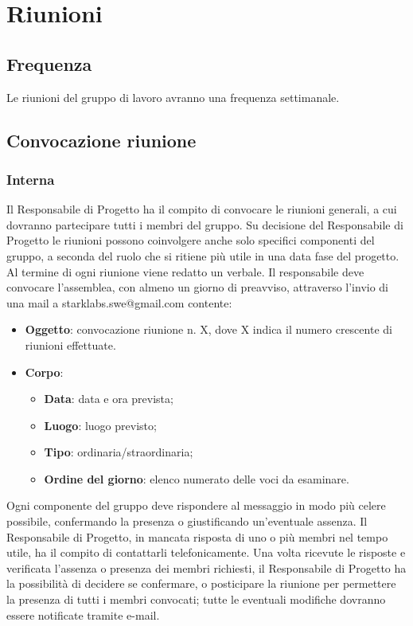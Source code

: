 \section{Riunioni}
\subsection{Frequenza}
Le riunioni del gruppo di lavoro avranno una frequenza settimanale.

\subsection{Convocazione riunione}

\subsubsection {Interna}
Il Responsabile di Progetto ha il compito di convocare le riunioni generali, a 
cui dovranno partecipare tutti i membri del gruppo.
Su decisione del Responsabile di Progetto le riunioni possono coinvolgere anche 
solo specifici componenti del gruppo, a seconda del ruolo che si ritiene più 
utile in una data fase del progetto. Al termine di ogni riunione viene redatto 
un verbale.
Il responsabile deve convocare l'assemblea, con almeno un giorno di preavviso, 
attraverso l'invio di una mail a starklabs.swe@gmail.com contente:
\begin{itemize}
\item \textbf{Oggetto}: convocazione riunione n. X, dove X indica il numero 
crescente di 
riunioni effettuate.
\item \textbf{Corpo}: 
\begin{itemize}
	\item \textbf{Data}: data e ora prevista;
	\item \textbf{Luogo}: luogo previsto;
	\item \textbf{Tipo}: ordinaria/straordinaria;
	\item \textbf{Ordine del giorno}: elenco numerato delle voci da esaminare.
\end{itemize}
\end{itemize}

Ogni componente del gruppo deve rispondere al messaggio in modo più celere 
possibile, confermando la presenza o giustificando un'eventuale assenza. Il 
Responsabile di Progetto, in mancata risposta di uno o più membri nel tempo 
utile, ha il compito di contattarli telefonicamente. Una volta ricevute le 
risposte e verificata l'assenza o presenza dei membri richiesti, il 
Responsabile di Progetto ha la possibilità di decidere se confermare, o 
posticipare la riunione per permettere la presenza di tutti i membri convocati; 
tutte le eventuali modifiche dovranno essere notificate tramite e-mail. 

